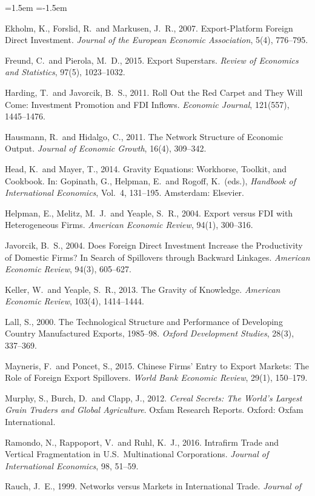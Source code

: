 \documentclass[11pt,a4paper]{article}
\begin{document}
\begin{list}{}{\leftmargin=1.5em \itemindent=-1.5em \itemsep=2pt \topsep=4pt}
\item Ekholm, K., Forslid, R.\ and Markusen, J.\ R., 2007. Export-Platform Foreign Direct
Investment. \emph{Journal of the European Economic Association}, 5(4), 776--795.
\item Freund, C.\ and Pierola, M.\ D., 2015. Export Superstars. \emph{Review of Economics and
Statistics}, 97(5), 1023--1032.
\item Harding, T.\ and Javorcik, B.\ S., 2011. Roll Out the Red Carpet and They Will Come:
Investment Promotion and FDI Inflows. \emph{Economic Journal}, 121(557), 1445--1476.
\item Hausmann, R.\ and Hidalgo, C., 2011. The Network Structure of Economic Output.
\emph{Journal of Economic Growth}, 16(4), 309--342.
\item Head, K.\ and Mayer, T., 2014. Gravity Equations: Workhorse, Toolkit, and Cookbook. In:
Gopinath, G., Helpman, E.\ and Rogoff, K.\ (eds.), \emph{Handbook of International Economics},
Vol.\ 4, 131--195. Amsterdam: Elsevier.
\item Helpman, E., Melitz, M.\ J.\ and Yeaple, S.\ R., 2004. Export versus FDI with Heterogeneous
Firms. \emph{American Economic Review}, 94(1), 300--316.
\item Javorcik, B.\ S., 2004. Does Foreign Direct Investment Increase the Productivity of Domestic
Firms? In Search of Spillovers through Backward Linkages. \emph{American Economic Review}, 94(3),
605--627.
\item Keller, W.\ and Yeaple, S.\ R., 2013. The Gravity of Knowledge. \emph{American Economic
Review}, 103(4), 1414--1444.
\item Lall, S., 2000. The Technological Structure and Performance of Developing Country
Manufactured Exports, 1985--98. \emph{Oxford Development Studies}, 28(3), 337--369.
\item Mayneris, F.\ and Poncet, S., 2015. Chinese Firms' Entry to Export Markets: The Role of
Foreign Export Spillovers. \emph{World Bank Economic Review}, 29(1), 150--179.
\item Murphy, S., Burch, D.\ and Clapp, J., 2012. \emph{Cereal Secrets: The World's Largest Grain
Traders and Global Agriculture}. Oxfam Research Reports. Oxford: Oxfam International.
\item Ramondo, N., Rappoport, V.\ and Ruhl, K.\ J., 2016. Intrafirm Trade and Vertical
Fragmentation in U.S.\ Multinational Corporations. \emph{Journal of International Economics}, 98,
51--59.
\item Rauch, J.\ E., 1999. Networks versus Markets in International Trade. \emph{Journal of
}
\end{list}
\end{document}
